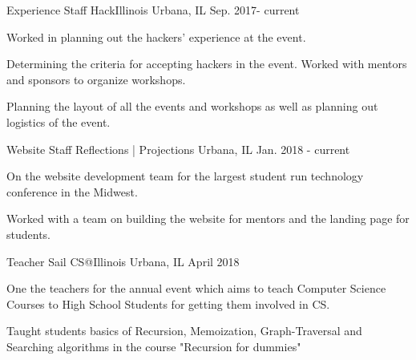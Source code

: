 \begin{cventries}
  \cventry
    {Experience Staff}
    {HackIllinois}
    {Urbana, IL}
    {Sep. 2017- current}
    {
      \begin{cvitems}
        \item {Worked in planning out the hackers' experience at the event.}
        \item {Determining the criteria for accepting hackers in the event. Worked with mentors and sponsors to organize workshops.}
        \item {Planning the layout of all the events and workshops as well as planning out logistics of the event.}
      \end{cvitems}
      \vspace*{-0.4cm}
    }
  \cventry
    {Website Staff}
    {Reflections | Projections}
    {Urbana, IL}
    {Jan. 2018 - current}
    {
      \begin{cvitems}
        \item {On the website development team for the largest student run technology conference in the Midwest.}
        \item {Worked with a team on building the website for mentors and the landing page for students.}
      \end{cvitems}
    }
    \cventry
    {Teacher}
    { Sail CS@Illinois}
    {Urbana, IL}
    {April 2018}
    {
        \begin{cvitems}
            \item {One the teachers for the annual event which aims to teach Computer Science Courses to High School Students for getting them involved in CS.}
            \item {Taught students basics of Recursion, Memoization, Graph-Traversal and Searching algorithms in the course "Recursion for dummies"}
        \end{cvitems}
        \vspace*{0.55cm}
    }
\end{cventries}
